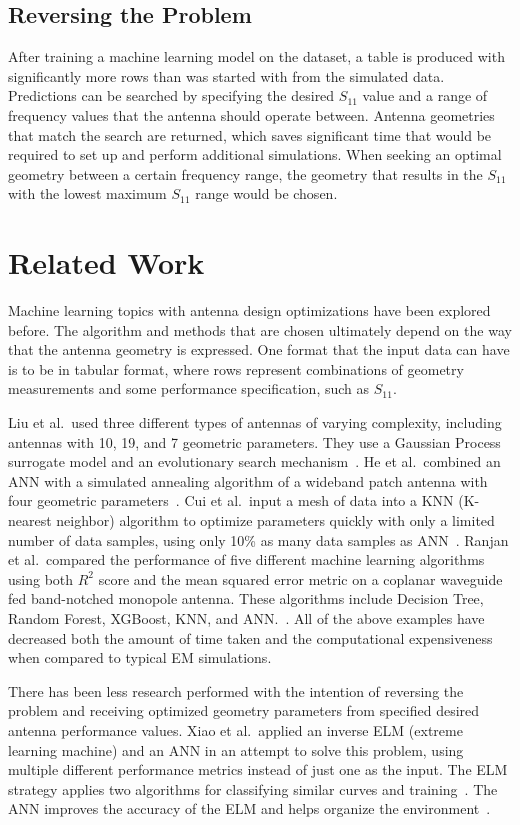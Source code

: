 \documentclass[lettersize,journal]{IEEEtran}
\begin{document}
\subsection{Reversing the Problem}
After training a machine learning model on the dataset, a table is produced with significantly more rows than was started with from the simulated data. Predictions can be searched by specifying the desired $S_{11}$ value and a range of frequency values that the antenna should operate between. Antenna geometries that match the search are returned, which saves significant time that would be required to set up and perform additional simulations. When seeking an optimal geometry between a certain frequency range, the geometry that results in the $S_{11}$ with the lowest maximum $S_{11}$ range would be chosen.

\section{Related Work}
Machine learning topics with antenna design optimizations have been explored before. The algorithm and methods that are chosen ultimately depend on the way that the antenna geometry is expressed. One format that the input data can have is to be in tabular format, where rows represent combinations of geometry measurements and some performance specification, such as $S_{11}$.

Liu et al.~used three different types of antennas of varying complexity, including antennas with 10, 19, and 7 geometric parameters. They use a Gaussian Process surrogate model and an evolutionary search mechanism~\cite{liu_efficient_2014}. He et al.~combined an ANN with a simulated annealing algorithm of a wideband patch antenna with four geometric parameters~\cite{10318051}. Cui et al.~input a mesh of data into a KNN (K-nearest neighbor) algorithm to optimize parameters quickly with only a limited number of data samples, using only 10\% as many data samples as ANN~\cite{9119820}. Ranjan et al.~compared the performance of five different machine learning algorithms using both $R^2$ score and the mean squared error metric on a coplanar waveguide fed band-notched monopole antenna. These algorithms include Decision Tree, Random Forest, XGBoost, KNN, and ANN.~\cite{ranjan_ultra-wideband_2022}. All of the above examples have decreased both the amount of time taken and the computational expensiveness when compared to typical EM simulations.

There has been less research performed with the intention of reversing the problem and receiving optimized geometry parameters from specified desired antenna performance values. Xiao et al.~applied an inverse ELM (extreme learning machine) and an ANN in an attempt to solve this problem, using multiple different performance metrics instead of just one as the input. The ELM strategy applies two algorithms for classifying similar curves and training~\cite{9063448}. The ANN improves the accuracy of the ELM and helps organize the environment~\cite{XiaoLi-Ye2021IANN}.
\end{document}
